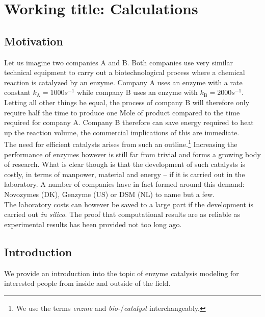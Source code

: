 
\chapter[Working title: Calculations]
{Working title: Calculations\label{ch1}}



\section{Motivation}\label{sec:mot}

Let us imagine two companies A and B.
Both companies use very similar technical equipment to carry out a biotechnological process where a chemical reaction is catalyzed by an enzyme.
Company A uses an enzyme with a rate constant $k_\text{A} = 1000s^{-1}$ while company B uses an enzyme with $k_\text{B} = 2000s^{-1}$.
Letting all other things be equal, the process of company B will therefore only require half the time to produce one Mole of product compared to the time required for company A.
Company B therefore can save energy required to heat up the reaction volume, the commercial implications of this are immediate.\\
The need for efficient catalysts arises from such an outline.\footnote{We use the terms \textit{enzme} and \textit{bio-}/\textit{catalyst} interchangeably.}
Increasing the performance of enzymes however is still far from trivial and forms a growing body of research.
What is clear though is that the development of such catalysts is costly, in terms of manpower, material and energy -- if it is carried out in the laboratory.
A number of companies have in fact formed around this demand: Novozymes (DK), Genzyme (US) or DSM (NL) to name but a few\citep{meyer2013use}.\\
The laboratory costs can however be saved to a large part if the development is carried out \textit{in silico}.
The proof that computational results are as reliable as experimental results has been provided not too long ago\citep{claeyssens2006high}.




\section{Introduction}\label{sec:intro}
We provide an introduction into the topic of enzyme catalysis modeling for interested people from inside and outside of the field.




